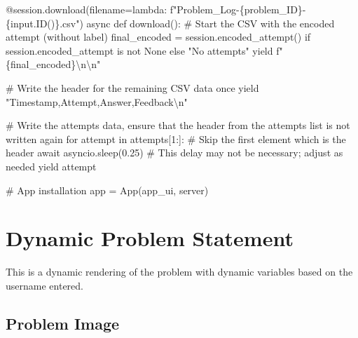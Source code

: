 \documentclass[
  letterpaper,
  DIV=11,
  numbers=noendperiod]{scrreprt}
\newenvironment{Shaded}{\begin{snugshade}}{\end{snugshade}}
\newcommand{\NormalTok}[1]{\textcolor[rgb]{0.00,0.23,0.31}{#1}}
\begin{document}
\begin{Shaded}
\begin{Highlighting}[]
\NormalTok{    @session.download(filename=lambda: f"Problem\_Log{-}\{problem\_ID\}{-}\{input.ID()\}.csv")}
\NormalTok{    async def download():}
\NormalTok{        \# Start the CSV with the encoded attempt (without label)}
\NormalTok{        final\_encoded = session.encoded\_attempt() if session.encoded\_attempt is not None else "No attempts"}
\NormalTok{        yield f"\{final\_encoded\}\textbackslash{}n\textbackslash{}n"}
        
\NormalTok{        \# Write the header for the remaining CSV data once}
\NormalTok{        yield "Timestamp,Attempt,Answer,Feedback\textbackslash{}n"}
        
\NormalTok{        \# Write the attempts data, ensure that the header from the attempts list is not written again}
\NormalTok{        for attempt in attempts[1:]:  \# Skip the first element which is the header}
\NormalTok{            await asyncio.sleep(0.25)  \# This delay may not be necessary; adjust as needed}
\NormalTok{            yield attempt}


\NormalTok{\# App installation}
\NormalTok{app = App(app\_ui, server)}
\end{Highlighting}
\end{Shaded}

\chapter*{Dynamic Problem Statement}\label{dynamic-problem-statement}


This is a dynamic rendering of the problem with dynamic variables based
on the username entered.

\section*{Problem Image}\label{problem-image-21}

\end{document}
